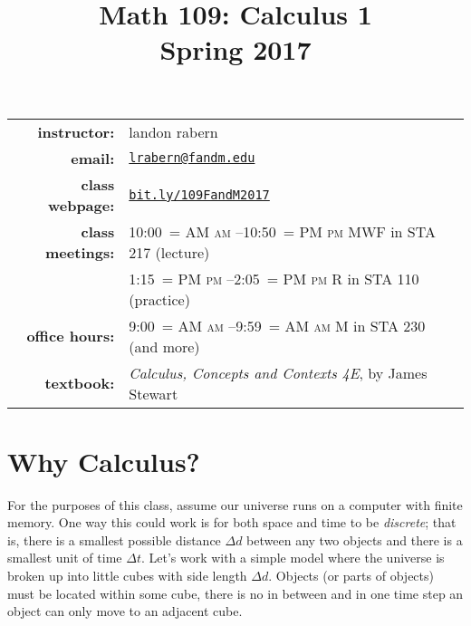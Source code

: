 \documentclass[12pt]{article}
\title{Math 109: Calculus 1\\ \bigskip\small{Spring 2017}}
\date{}
\makeatletter
\DeclareRobustCommand{\maybefakesc}[1]{%
  \ifnum\pdfstrcmp{\f@series}{\bfdefault}=\z@
    {\fontsize{\dimexpr0.8\dimexpr\f@size pt\relax}{0}\selectfont\uppercase{#1}}%
  \else
    \textsc{#1}%
  \fi
}
\newcommand\AM{\,\maybefakesc{am}\xspace}
\newcommand\PM{\,\maybefakesc{pm}\xspace}
\makeatother
\begin{document}
\maketitle

\begin{tabular}{r l}
\textbf{instructor:}& landon rabern\\
\textbf{email:}& \href{mailto:lrabern@fandm.edu}{\nolinkurl{lrabern@fandm.edu}}\\
\textbf{class webpage:}& \href{http://bit.ly/109FandM2017}{\nolinkurl{bit.ly/109FandM2017}}\\
\textbf{class meetings:}& 10:00\AM--10:50\PM MWF in STA 217 (lecture)\\
& 1:15\PM--2:05\PM R in STA 110 (practice)\\
\textbf{office hours:}& 9:00\AM--9:59\AM M in STA 230 (and more)\\
\textbf{textbook:}&\textit{Calculus, Concepts and Contexts 4E}, by James Stewart\\
\end{tabular}

\bigskip

\section*{Why Calculus?}
For the purposes of this class, assume our universe runs on a computer with finite memory.  One way this could work is for both space and time to be \emph{discrete}; that is, there is a smallest possible distance $\Delta d$ between any two objects and there is a smallest unit of time $\Delta t$.  Let's work with a simple model where the universe is broken up into little cubes with side length $\Delta d$.  Objects (or parts of objects) must be located within some cube, there is no in between and in one time step an object can only move to an adjacent cube.  
\end{document}
